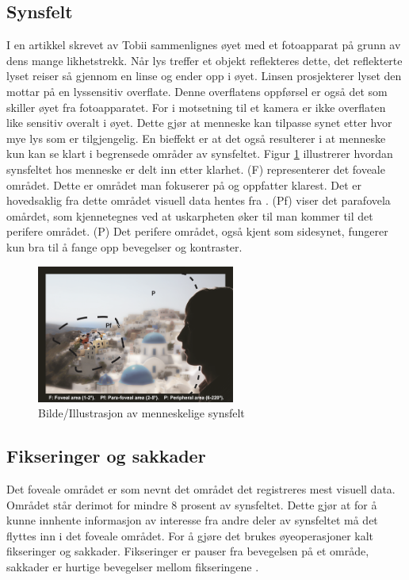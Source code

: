 \documentclass[phd,tocprelim]{cornell}
\begin{document}
\subsection{Synsfelt}

I en artikkel skrevet av Tobii \cite{Calibration} sammenlignes øyet med et fotoapparat på grunn av dens mange likhetstrekk. Når lys treffer et objekt reflekteres dette, det reflekterte lyset reiser så gjennom en linse og ender opp i øyet. Linsen prosjekterer lyset den mottar på en lyssensitiv overflate. Denne overflatens oppførsel er også det som skiller øyet fra fotoapparatet. For i motsetning til et kamera er ikke overflaten like sensitiv overalt i øyet.  Dette gjør at menneske kan tilpasse synet etter hvor mye lys som er tilgjengelig. En bieffekt er at det også resulterer i at menneske kun kan se klart i begrensede områder av synsfeltet. Figur \ref{fig:visueltArea} illustrerer hvordan synsfeltet hos menneske er delt inn etter klarhet. (F) representerer det foveale området. Dette er området man fokuserer på og oppfatter klarest. Det er hovedsaklig fra dette området visuell data hentes fra . (Pf) viser det parafovela omårdet, som kjennetegnes ved at uskarpheten øker til man kommer til det perifere området. (P) Det perifere området, også kjent som sidesynet, fungerer kun bra til å fange opp bevegelser og kontraster.

\begin{figure}[ht!]
\centering
\includegraphics[width=65mm]{fovealArea}
\caption{Bilde/Illustrasjon av menneskelige synsfelt \cite{VisualImage}}
\label{fig:visueltArea}
\end{figure}

\subsection{Fikseringer og sakkader}

Det foveale området er som nevnt det området det registreres mest visuell data. Området står derimot for mindre 8 prosent av synsfeltet. Dette gjør at for å kunne innhente informasjon av interesse fra andre deler av synsfeltet må det flyttes inn i  det foveale området. For å gjøre det brukes øyeoperasjoner kalt fikseringer og sakkader. Fikseringer er pauser fra bevegelsen på et område, sakkader er hurtige bevegelser mellom fikseringene \cite{Calibration}.
\end{document}
